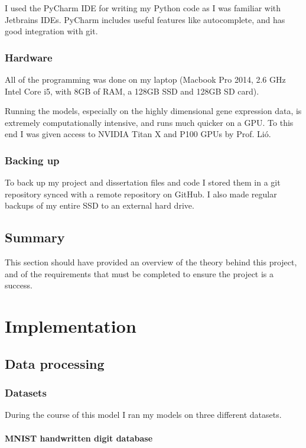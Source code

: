 \documentclass[12pt,a4paper,twoside,openright]{report}
\begin{document}
I used the PyCharm IDE for writing my Python code as I was familiar with Jetbrains IDEs.
PyCharm includes useful features like autocomplete, and has good integration with git.

\subsection{Hardware}

All of the programming was done on my laptop (Macbook Pro 2014, 2.6 GHz Intel Core i5, with 8GB of RAM, a 128GB SSD and 128GB SD card).

Running the models, especially on the highly dimensional gene expression data, is extremely computationally intensive, and runs much 
quicker on a GPU. To this end I was given access to NVIDIA Titan X and P100 GPUs by Prof. Li\'o.

\subsection{Backing up}

To back up my project and dissertation files and code I stored them in a git repository synced with a remote repository on GitHub. I also 
made regular backups of my entire SSD to an external hard drive.

\section{Summary}

This section should have provided an overview of the theory behind this project, and of the requirements that must be completed to 
ensure the project is a success.

\chapter{Implementation}

\section{Data processing}

\subsection{Datasets}

During the course of this model I ran my models on three different datasets.

\subsubsection{MNIST handwritten digit database}
\end{document}
